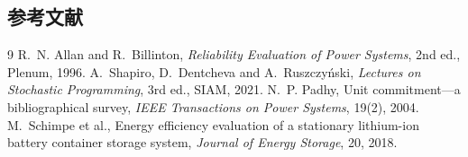 \subsection{参考文献}
{\renewcommand{\section}[2]{}\begin{thebibliography}{9}\small
{} R.~N. Allan and R.~Billinton, \emph{Reliability Evaluation of Power Systems}, 2nd ed., Plenum, 1996.
 A.~Shapiro, D.~Dentcheva and A.~Ruszczy\'nski,
\emph{Lectures on Stochastic Programming}, 3rd ed., SIAM, 2021.
 N.~P. Padhy, Unit commitment---a bibliographical survey,
\emph{IEEE Transactions on Power Systems}, 19(2), 2004.
 M.~Schimpe et al., Energy efficiency evaluation of a stationary lithium-ion battery container storage system,
\emph{Journal of Energy Storage}, 20, 2018.
\end{thebibliography}}
